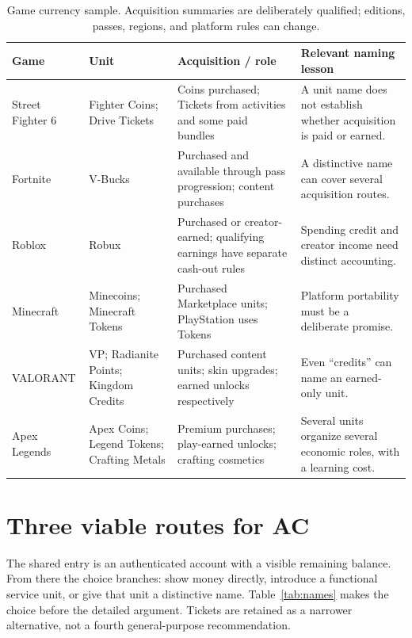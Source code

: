 \documentclass[10pt,letterpaper,twocolumn]{article}
\begin{document}
\begin{table}[t]
\small\renewcommand{\arraystretch}{1.17}
\caption{Game currency sample. Acquisition summaries are deliberately qualified; editions, passes, regions, and platform rules can change.}\label{tab:games}
\begin{tabularx}{\textwidth}{@{}p{.9in}p{1.5in}XX@{}}\toprule
Game & Unit & Acquisition / role & Relevant naming lesson \\\midrule
Street Fighter 6 & Fighter Coins; Drive Tickets & Coins purchased; Tickets from activities and some paid bundles~\cite{sfcoins,sftickets,sfeditions} & A unit name does not establish whether acquisition is paid or earned. \\
Fortnite & V-Bucks & Purchased and available through pass progression; content purchases~\cite{fortnite} & A distinctive name can cover several acquisition routes. \\
Roblox & Robux & Purchased or creator-earned; qualifying earnings have separate cash-out rules~\cite{roblox} & Spending credit and creator income need distinct accounting. \\
Minecraft & Minecoins; Minecraft Tokens & Purchased Marketplace units; PlayStation uses Tokens~\cite{minecraft,minecraftps} & Platform portability must be a deliberate promise. \\
VALORANT & VP; Radianite Points; Kingdom Credits & Purchased content units; skin upgrades; earned unlocks respectively~\cite{valorant,kingdom} & Even ``credits'' can name an earned-only unit. \\
Apex Legends & Apex Coins; Legend Tokens; Crafting Metals & Premium purchases; play-earned unlocks; crafting cosmetics~\cite{apex} & Several units organize several economic roles, with a learning cost. \\\bottomrule
\end{tabularx}
\end{table}

\section{Three viable routes for AC}
The shared entry is an authenticated account with a visible remaining balance. From there the choice branches: show money directly, introduce a functional service unit, or give that unit a distinctive name. Table~\ref{tab:names} makes the choice before the detailed argument. Tickets are retained as a narrower alternative, not a fourth general-purpose recommendation.
\end{document}
